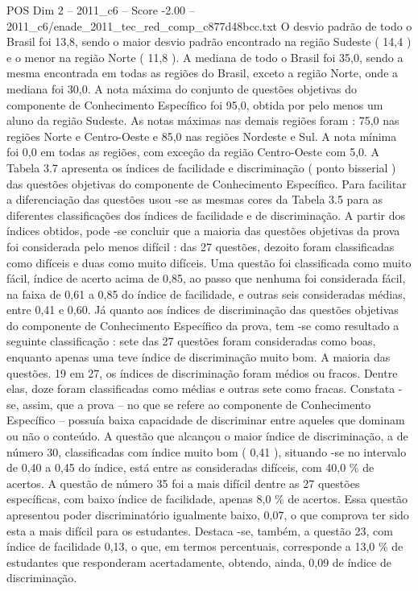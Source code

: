 \begin{textsample}{POS Dim 2 – 2011\_c6 – Score -2.00 – 2011\_c6/enade\_2011\_tec\_red\_comp\_c877d48bcc.txt}
O desvio padrão de todo o Brasil foi 13,8, sendo o maior desvio padrão encontrado na região Sudeste ( 14,4 ) e o menor na região Norte ( 11,8 ).
A mediana de todo o Brasil foi 35,0, sendo a mesma encontrada em todas as regiões do Brasil, exceto a região Norte, onde a mediana foi 30,0.
A nota máxima do conjunto de questões objetivas do componente de Conhecimento Específico foi 95,0, obtida por pelo menos um aluno da região Sudeste.
As notas máximas nas demais regiões foram : 75,0 nas regiões Norte e Centro-Oeste e 85,0 nas regiões Nordeste e Sul.
A nota mínima foi 0,0 em todas as regiões, com exceção da região Centro-Oeste com 5,0.
A Tabela 3.7 apresenta os índices de facilidade e discriminação ( ponto bisserial ) das questões objetivas do componente de Conhecimento Específico.
Para facilitar a diferenciação das questões usou -se as mesmas cores da Tabela 3.5 para as diferentes classificações dos índices de facilidade e de discriminação.
A partir dos índices obtidos, pode -se concluir que a maioria das questões objetivas da prova foi considerada pelo menos difícil : das 27 questões, dezoito foram classificadas como difíceis e duas como muito difíceis.
Uma questão foi classificada como muito fácil, índice de acerto acima de 0,85, ao passo que nenhuma foi considerada fácil, na faixa de 0,61 a 0,85 do índice de facilidade, e outras seis consideradas médias, entre 0,41 e 0,60.
Já quanto aos índices de discriminação das questões objetivas do componente de Conhecimento Específico da prova, tem -se como resultado a seguinte classificação : sete das 27 questões foram consideradas como boas, enquanto apenas uma teve índice de discriminação muito bom.
A maioria das questões. 19 em 27, os índices de discriminação foram médios ou fracos.
Dentre elas, doze foram classificadas como médias e outras sete como fracas.
Constata -se, assim, que a prova – no que se refere ao componente de Conhecimento Específico – possuía baixa capacidade de discriminar entre aqueles que dominam ou não o conteúdo.
A questão que alcançou o maior índice de discriminação, a de número 30, classificadas com índice muito bom ( 0,41 ), situando -se no intervalo de 0,40 a 0,45 do índice, está entre as consideradas difíceis, com 40,0 \% de acertos.
A questão de número 35 foi a mais difícil dentre as 27 questões específicas, com baixo índice de facilidade, apenas 8,0 \% de acertos.
Essa questão apresentou poder discriminatório igualmente baixo, 0,07, o que comprova ter sido esta a mais difícil para os estudantes.
Destaca -se, também, a questão 23, com índice de facilidade 0,13, o que, em termos percentuais, corresponde a 13,0 \% de estudantes que responderam acertadamente, obtendo, ainda, 0,09 de índice de discriminação.

\end{textsample}
